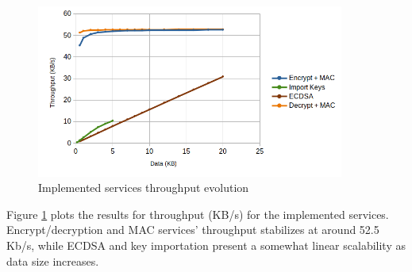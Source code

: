 \begin{figure}[h!]
	\centering
	\includegraphics[width=0.9\textwidth]{./Images/services-tput.png}
	\caption{Implemented services throughput evolution}
	\label{fig:performance:services-tput}
\end{figure}

Figure \ref{fig:performance:services-tput} plots the results for throughput (KB/s) for the implemented services.
Encrypt/decryption and MAC services' throughput stabilizes at around 52.5 Kb/s, while \ac{ECDSA} and key importation present a somewhat linear scalability as data size increases.



